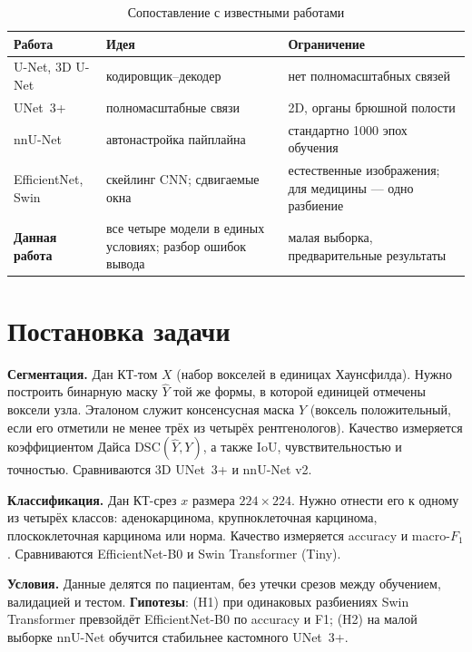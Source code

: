 \documentclass{misisarticle}
\begin{document}
\begin{table}[htbp]
\caption{Сопоставление с известными работами}
\centering\footnotesize
\begin{tabular}{>{\raggedright\arraybackslash}p{1.9cm}>{\raggedright\arraybackslash}p{2.3cm}>{\raggedright\arraybackslash}p{2.3cm}}
\toprule
Работа & Идея & Ограничение\\
\midrule
U-Net, 3D U-Net~\cite{unet,unet3d} & кодировщик–декодер & нет полномасштабных связей\\
UNet~3+~\cite{huang} & полномасштабные связи & 2D, органы брюшной полости\\
nnU-Net~\cite{isensee} & автонастройка пайплайна & стандартно 1000 эпох обучения\\
EfficientNet, Swin~\cite{tan,liu} & скейлинг CNN; сдвигаемые окна & естественные изображения; для медицины — одно разбиение~\cite{raza}\\
\textbf{Данная работа} & все четыре модели в единых условиях; разбор ошибок вывода & малая выборка, предварительные результаты\\
\bottomrule
\end{tabular}
\label{tab:related}
\end{table}

\section{Постановка задачи}\label{sec:task}
\textbf{Сегментация.} Дан КТ-том $X$ (набор вокселей в единицах Хаунсфилда). Нужно построить бинарную маску $\hat{Y}$ той же формы, в которой единицей отмечены воксели узла. Эталоном служит консенсусная маска $Y$ (воксель положительный, если его отметили не менее трёх из четырёх рентгенологов). Качество измеряется коэффициентом Дайса $\mathrm{DSC}(\hat{Y},Y)$, а также IoU, чувствительностью и точностью. Сравниваются 3D UNet~3+ и nnU-Net v2.

\textbf{Классификация.} Дан КТ-срез $x$ размера $224\times224$. Нужно отнести его к одному из четырёх классов: аденокарцинома, крупноклеточная карцинома, плоскоклеточная карцинома или норма. Качество измеряется accuracy и macro-$F_1$. Сравниваются EfficientNet-B0 и Swin Transformer (Tiny).

\textbf{Условия.} Данные делятся по пациентам, без утечки срезов между обучением, валидацией и тестом. \textbf{Гипотезы}: (H1) при одинаковых разбиениях Swin Transformer превзойдёт EfficientNet-B0 по accuracy и F1; (H2) на малой выборке nnU-Net обучится стабильнее кастомного UNet~3+.
\end{document}
